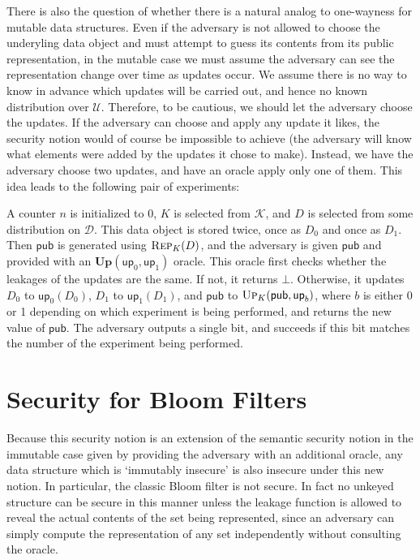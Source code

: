\documentclass[11pt, pdftex]{article}
\begin{document}
There is also the question of whether there is a natural analog to one-wayness for mutable data structures. Even if the adversary is not allowed to choose the underyling data object and must attempt to guess its contents from its public representation, in the mutable case we must assume the adversary can see the representation change over time as updates occur. We assume there is no way to know in advance which updates will be carried out, and hence no known distribution over $\mathcal{U}$. Therefore, to be cautious, we should let the adversary choose the updates. If the adversary can choose and apply any update it likes, the security notion would of course be impossible to achieve (the adversary will know what elements were added by the updates it chose to make). Instead, we have the adversary choose two updates, and have an oracle apply only one of them. This idea leads to the following pair of experiments:

A counter $n$ is initialized to 0, $K$ is selected from $\mathcal{K}$, and $D$ is selected from some distribution on $\mathcal{D}$. This data object is stored twice, once as $D_0$ and once as $D_1$. Then $\mathsf{pub}$ is generated using $\textsc{Rep}_K(D)$, and the adversary is given $\mathsf{pub}$ and provided with an $\mathbf{Up}(\mathsf{up}_0,\mathsf{up}_1)$ oracle. This oracle first checks whether the leakages of the updates are the same. If not, it returns $\bot$. Otherwise, it updates $D_0$ to $\mathsf{up}_0(D_0)$, $D_1$ to $\mathsf{up}_1(D_1)$, and $\mathsf{pub}$ to $\textsc{Up}_K(\mathsf{pub},\mathsf{up}_b)$, where $b$ is either 0 or 1 depending on which experiment is being performed, and returns the new value of $\mathsf{pub}$. The adversary outputs a single bit, and succeeds if this bit matches the number of the experiment being performed.

\section{Security for Bloom Filters}

Because this security notion is an extension of the semantic security notion in the immutable case given by providing the adversary with an additional oracle, any data structure which is `immutably insecure' is also insecure under this new notion. In particular, the classic Bloom filter is not secure. In fact no unkeyed structure can be secure in this manner unless the leakage function is allowed to reveal the actual contents of the set being represented, since an adversary can simply compute the representation of any set independently without consulting the oracle.
\end{document}
